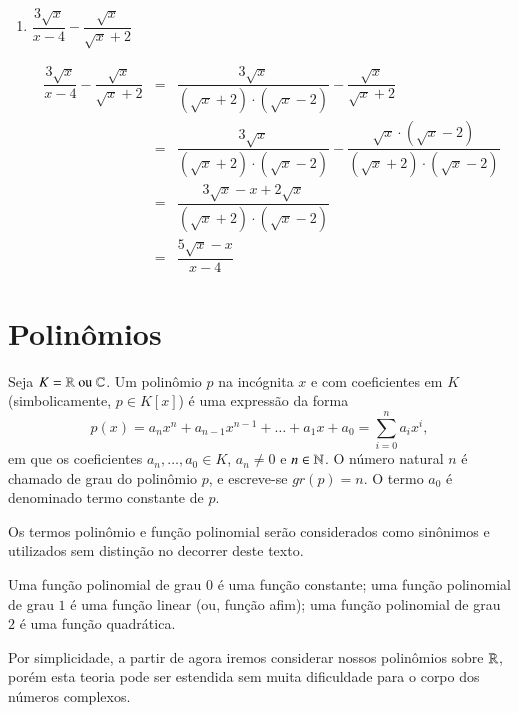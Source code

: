 \begin{exem}
\begin{enumerate}
   \item $\dfrac{3\sqrt{x}}{x-4} - \dfrac{\sqrt{x}}{\sqrt{x}+2}$
   
   \begin{eqnarray*}
    \dfrac{3\sqrt{x}}{x-4} - \dfrac{\sqrt{x}}{\sqrt{x}+2} &=& \dfrac{3\sqrt{x}}{(\sqrt{x}+2) \cdot (\sqrt{x}-2)} - \dfrac{\sqrt{x}}{\sqrt{x}+2} \\
    &=& \dfrac{3\sqrt{x}}{(\sqrt{x}+2) \cdot (\sqrt{x}-2)} - \dfrac{\sqrt{x} \cdot (\sqrt{x}-2)}{(\sqrt{x}+2) \cdot (\sqrt{x}-2)} \\
    &=& \dfrac{3\sqrt{x} - x + 2\sqrt{x}}{(\sqrt{x}+2) \cdot (\sqrt{x}-2)} \\
    &=& \dfrac{5\sqrt{x} - x}{x-4}
   \end{eqnarray*}

  

  \end{enumerate}

 \end{exem}

 
 \chapter{Polinômios}

  \vskip0.3cm
 \colorbox{azul}{
 \begin{minipage}{0.9\linewidth}
 \begin{center}
  Seja $K= \mathbb{R} \text{ ou } \mathbb{C}$. Um polinômio $p$ na incógnita $x$ e com coeficientes em $K$ (simbolicamente, $p \in K[x]$) é uma expressão da forma
  \[p(x)= a_nx^n + a_{n-1}x^{n-1}+ \ldots + a_1x+ a_0= \sum_{i=0}^{n} a_ix^i ,\]
  em que os coeficientes $a_n, \ldots, a_0 \in K$, $a_n \neq 0$ e $n \in \mathbb{N}$. O número natural $n$ é chamado de grau do polinômio $p$, e escreve-se $gr(p)= n$. O termo $a_0$ é denominado termo constante de $p$.
 \end{center}
 \end{minipage}}
 \vskip0.3cm

 \begin{obs}
 Os termos polinômio e função polinomial serão considerados como sinônimos e utilizados sem distinção no decorrer deste texto.
 \end{obs}

 Uma função polinomial de grau $0$ é uma função constante; uma função polinomial de grau $1$ é uma função linear (ou, função afim); uma função polinomial de grau $2$ é uma função quadrática.

 Por simplicidade, a partir de agora iremos considerar nossos polinômios sobre $\mathbb{R}$, porém esta teoria pode ser estendida sem muita dificuldade para o corpo dos números complexos.


